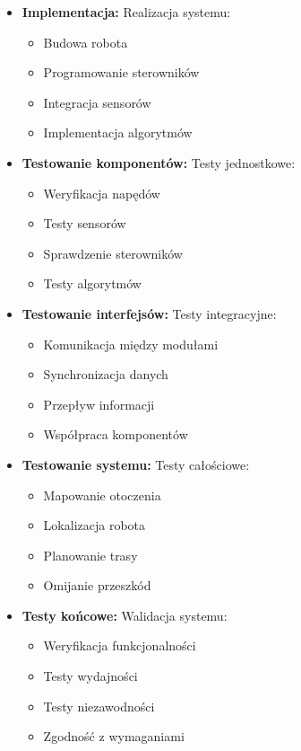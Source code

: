 \documentclass[a4paper,twoside,12pt]{book}
\begin{document}
\begin{itemize}
	\item \textbf{Implementacja:} Realizacja systemu:
	\begin{itemize}
		\item Budowa robota
		\item Programowanie sterowników
		\item Integracja sensorów
		\item Implementacja algorytmów
	\end{itemize}
\newpage
	\item \textbf{Testowanie komponentów:} Testy jednostkowe:
	\begin{itemize}
		\item Weryfikacja napędów
		\item Testy sensorów
		\item Sprawdzenie sterowników
		\item Testy algorytmów
	\end{itemize}

	\item \textbf{Testowanie interfejsów:} Testy integracyjne:
	\begin{itemize}
		\item Komunikacja między modułami
		\item Synchronizacja danych
		\item Przepływ informacji
		\item Współpraca komponentów
	\end{itemize}

	\item \textbf{Testowanie systemu:} Testy całościowe:
	\begin{itemize}
		\item Mapowanie otoczenia
		\item Lokalizacja robota
		\item Planowanie trasy
		\item Omijanie przeszkód
	\end{itemize}

	\item \textbf{Testy końcowe:} Walidacja systemu:
	\begin{itemize}
		\item Weryfikacja funkcjonalności
		\item Testy wydajności
		\item Testy niezawodności
		\item Zgodność z wymaganiami
	\end{itemize}
\end{itemize}
\newpage
\end{document}
